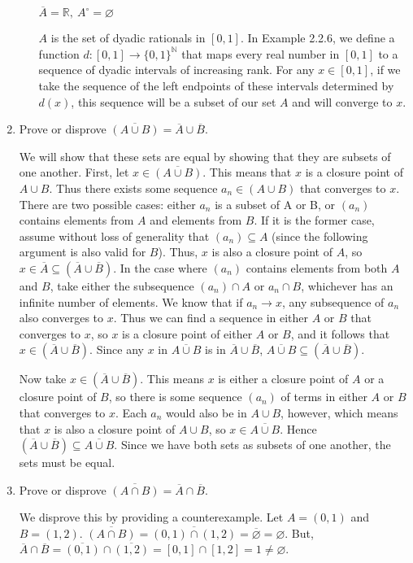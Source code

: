 \documentclass[11pt]{article}
\newcommand{\N}{\mathbb{N}}
\newcommand{\R}{\mathbb{R}}
\begin{document}
\begin{enumerate}
\begin{enumerate}
$\overline{A}=\R,\ A^\circ=\varnothing$

$A$ is the set of dyadic rationals in $[0,1]$. In Example 2.2.6, we define
a function $d:[0,1]\to\{0,1\}^\N$ that maps every real number in $[0,1]$
to a sequence of dyadic intervals of increasing rank. For any 
$x\in [0,1]$, if we take the sequence
of the left endpoints of these intervals determined by $d(x)$,
this sequence will be a subset
of our set $A$ and will converge to $x$.
\end{enumerate}
\item{Prove or disprove $\overline{(A\cup B)}=\overline{A}\cup\overline{B}$.}

We will show that these sets are equal by showing that they are subsets
of one another. First, let $x\in\overline{(A\cup B)}$. This means that
$x$ is a closure point of $A\cup B$. Thus there exists some sequence 
$a_n\in(A\cup B)$ that converges to $x$. There are two possible cases:
either $a_n$ is a subset of A or B, or $(a_n)$ contains elements from $A$
and elements from $B$. If it is the former case, assume without loss of
generality that $(a_n)\subseteq A$ (since the following argument is also
valid for $B$). Thus, $x$ is also a closure point of $A$, so
$x\in\overline{A}\subseteq(\overline{A}\cup\overline{B})$. In the case
where $(a_n)$ contains elements from both $A$ and $B$, take either the
subsequence $(a_n)\cap A$ or $a_n\cap B$, whichever has an infinite
number of elements. We know that if $a_n\to x$, any subsequence of $a_n$
also converges to $x$. Thus we can find a sequence in either $A$ or $B$
that converges to $x$, so $x$ is a closure point of either $A$ or $B$, and it
follows that $x\in(\overline{A}\cup\overline{B})$. 
Since any $x$ in
$\overline{A\cup B}$ is in $\overline{A}\cup\overline{B}$,
$\overline{A\cup B}\subseteq(\overline{A}\cup\overline{B})$.

Now take $x\in(\overline{A}\cup\overline{B})$. This means $x$ is either
a closure point of $A$ or a closure point of $B$, so there is some sequence
$(a_n)$ of terms in either $A$ or $B$ that converges to $x$. Each $a_n$ would
also be in $A\cup B$, however, which means that $x$ is also a closure point 
of $A\cup B$, so $x\in\overline{A\cup B}$.
Hence $(\overline{A}\cup\overline{B})\subseteq\overline{A\cup B}$.
Since we have both sets as subsets of one another, the sets must be equal.

\item{Prove or disprove $\overline{(A\cap B)}=\overline{A}\cap\overline{B}$.}

We disprove this by providing a counterexample.
Let $A=(0,1)$ and $B=(1,2)$. $\overline{(A\cap B)} = \overline{(0,1)\cap(1,2)}
= \overline{\varnothing} = \varnothing$.
But, $\overline{A}\cap\overline{B} = \overline{(0,1)}\cap\overline{(1,2)}
= [0,1]\cap[1,2] = {1} \neq \varnothing$.

\end{enumerate}
\end{document}
